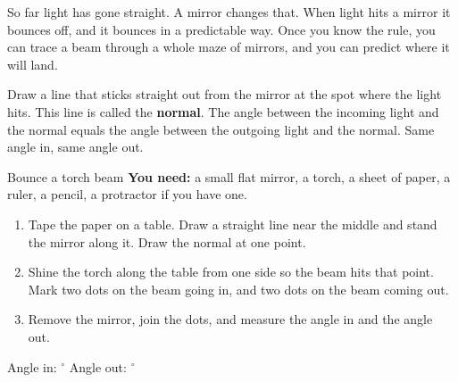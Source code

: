 \label{ch5}

So far light has gone straight. A mirror changes that. When light hits a mirror it bounces off, and it bounces in a predictable way. Once you know the rule, you can trace a beam through a whole maze of mirrors, and you can predict where it will land.

Draw a line that sticks straight out from the mirror at the spot where the light hits. This line is called the \textbf{normal}. The angle between the incoming light and the normal equals the angle between the outgoing light and the normal. Same angle in, same angle out.

\begin{center}
\end{center}

\begin{tryit}{Bounce a torch beam}
\textbf{You need:} a small flat mirror, a torch, a sheet of paper, a ruler, a pencil, a protractor if you have one.
\begin{enumerate}[leftmargin=1.6em]
\item Tape the paper on a table. Draw a straight line near the middle and stand the mirror along it. Draw the normal at one point.
\item Shine the torch along the table from one side so the beam hits that point. Mark two dots on the beam going in, and two dots on the beam coming out.
\item Remove the mirror, join the dots, and measure the angle in and the angle out.
\end{enumerate}
Angle in: \wline[1.6cm]$^\circ$ \quad Angle out: \wline[1.6cm]$^\circ$
\end{tryit}

